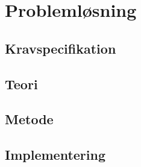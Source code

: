 \chapter{Problemløsning}


\section{Kravspecifikation}

\clearpage

\section{Teori}




\clearpage

\section{Metode}






\clearpage

\section{Implementering}








\clearpage